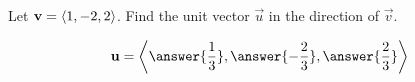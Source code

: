 \documentclass{ximera}
\author{Gregory Hartman \and Matthew Carr}
\begin{document}
\begin{exercise}




Let $\mathbf{v}=\left\langle 1,-2,2\right\rangle$. Find the unit vector $\vec{u}$ in the direction of $\vec{v}$.

\begin{prompt}
\[
\vec{u}=\vector{\answer{\frac{1}{3}},\answer{-\frac{2}{3}},\answer{\frac{2}{3}}}
\]
\end{prompt}

\end{exercise}
\end{document}
